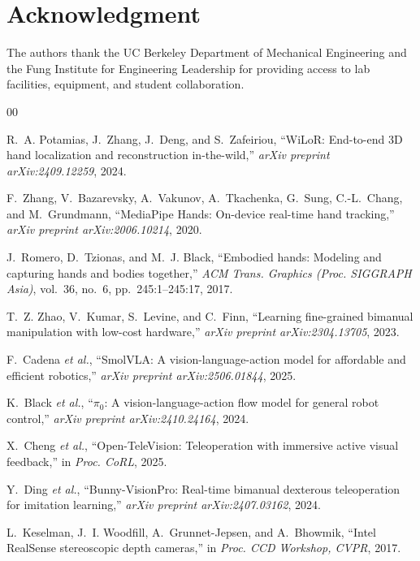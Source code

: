 \documentclass{ieeeaccess}
\begin{document}
\section*{Acknowledgment}
The authors thank the UC Berkeley Department of Mechanical Engineering
and the Fung Institute for Engineering Leadership for providing
access to lab facilities, equipment, and student collaboration.

\begin{thebibliography}{00}

R.~A. Potamias, J.~Zhang, J.~Deng, and S.~Zafeiriou,
``WiLoR: End-to-end 3D hand localization and reconstruction in-the-wild,''
\emph{arXiv preprint arXiv:2409.12259}, 2024.

F.~Zhang, V.~Bazarevsky, A.~Vakunov, A.~Tkachenka, G.~Sung, C.-L.~Chang,
and M.~Grundmann,
``MediaPipe Hands: On-device real-time hand tracking,''
\emph{arXiv preprint arXiv:2006.10214}, 2020.

J.~Romero, D.~Tzionas, and M.~J. Black,
``Embodied hands: Modeling and capturing hands and bodies together,''
\emph{ACM Trans. Graphics (Proc. SIGGRAPH Asia)},
vol.~36, no.~6, pp.~245:1--245:17, 2017.

T.~Z. Zhao, V.~Kumar, S.~Levine, and C.~Finn,
``Learning fine-grained bimanual manipulation with low-cost hardware,''
\emph{arXiv preprint arXiv:2304.13705}, 2023.

F.~Cadena \emph{et al.},
``SmolVLA: A vision-language-action model for affordable and efficient
robotics,''
\emph{arXiv preprint arXiv:2506.01844}, 2025.

K.~Black \emph{et al.},
``$\pi_0$: A vision-language-action flow model for general robot control,''
\emph{arXiv preprint arXiv:2410.24164}, 2024.

X.~Cheng \emph{et al.},
``Open-TeleVision: Teleoperation with immersive active visual feedback,''
in \emph{Proc. CoRL}, 2025.

Y.~Ding \emph{et al.},
``Bunny-VisionPro: Real-time bimanual dexterous teleoperation for
imitation learning,''
\emph{arXiv preprint arXiv:2407.03162}, 2024.

L.~Keselman, J.~I. Woodfill, A.~Grunnet-Jepsen, and A.~Bhowmik,
``Intel RealSense stereoscopic depth cameras,''
in \emph{Proc. CCD Workshop, CVPR}, 2017.


\end{thebibliography}
\end{document}
